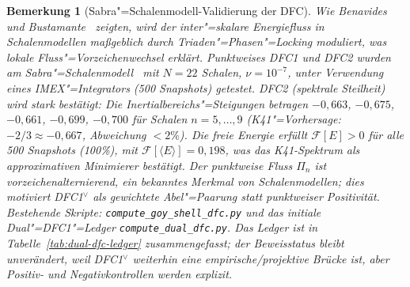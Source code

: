 \documentclass[12pt,a4paper]{article}
\theoremstyle{breakdef}
\theoremstyle{breakplain}
\theoremstyle{breakdef}
\newtheorem{remark}[definition]{Bemerkung}
\begin{document}
\begin{remark}[Sabra"=Schalenmodell-Validierung der DFC]
\label{rem:sabra-dfc}
Wie Benavides und Bustamante~\cite{BenavidesBustamante2025} zeigten, wird der inter"=skalare Energiefluss in Schalenmodellen maßgeblich durch Triaden"=Phasen"=Locking moduliert, was lokale Fluss"=Vorzeichenwechsel erklärt. Punktweises DFC1 und DFC2 wurden am Sabra"=Schalenmodell~\cite{Lvov98} mit $N=22$ Schalen, $\nu = 10^{-7}$, unter Verwendung eines IMEX"=Integrators (500 Snapshots) getestet. DFC2 (spektrale Steilheit) wird stark bestätigt: Die Inertialbereichs"=Steigungen betragen $-0{,}663$, $-0{,}675$, $-0{,}661$, $-0{,}699$, $-0{,}700$ für Schalen $n=5,\ldots,9$ (K41"=Vorhersage: $-2/3 \approx -0{,}667$, Abweichung $< 2\%$). Die freie Energie erfüllt $\mathcal{F}[E] > 0$ für alle 500 Snapshots (100\%), mit $\mathcal{F}[\langle E \rangle] = 0{,}198$, was das K41-Spektrum als approximativen Minimierer bestätigt. Der punktweise Fluss $\Pi_n$ ist vorzeichenalternierend, ein bekanntes Merkmal von Schalenmodellen; dies motiviert DFC1$^\vee$ als gewichtete Abel"=Paarung statt punktweiser Positivität. Bestehende Skripte: \texttt{compute\_goy\_shell\_dfc.py} und das initiale Dual"=DFC1"=Ledger \texttt{compute\_dual\_dfc.py}. Das Ledger ist in Tabelle~\ref{tab:dual-dfc-ledger} zusammengefasst; der Beweisstatus bleibt unverändert, weil DFC1$^\vee$ weiterhin eine empirische/projektive Brücke ist, aber Positiv- und Negativkontrollen werden explizit.
\end{remark}
\end{document}
